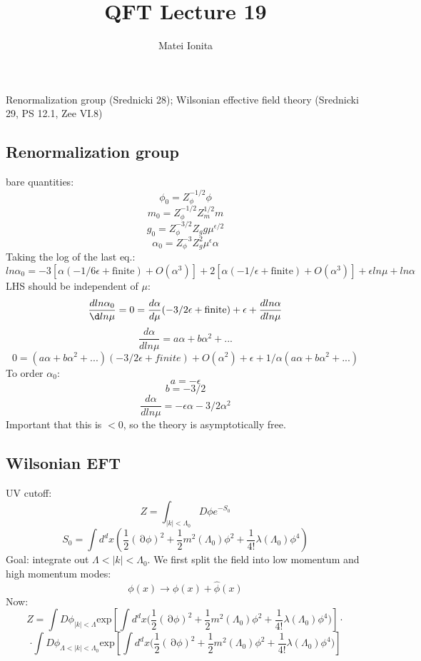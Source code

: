 \documentclass[12 pt]{article}
\title{QFT Lecture 19}
\author{Matei Ionita}
\DeclareMathOperator {\p} {\partial}
\begin{document}
  \maketitle

Renormalization group (Srednicki 28); Wilsonian effective field theory (Srednicki 29, PS 12.1, Zee VI.8)

\subsection*{Renormalization group}

bare quantities:
\[    \phi_0  = Z_{\phi}^{-1/2} \phi    \]
\[    m_0 = Z_{\phi}^{-1/2} Z_m^{1/2} m  \]
\[    g_0 = Z_{\phi}^{-3/2} Z_g g \mu^{\epsilon/2}  \]
\[    \alpha_0 = Z_{\phi}^{-3} Z_g^2 \mu^{\epsilon} \alpha        \]
Taking the log of the last eq.:
\[      ln \alpha_0 = -3 [ \alpha(-1/6\epsilon + \text{finite} ) + O(\alpha^3) ] + 2[\alpha(-1/\epsilon + \text{finite}) + O(\alpha^3)] + \epsilon ln\mu + ln\alpha  \]
LHS should be independent of $\mu$:
\[     \frac{d ln\alpha_0}{\d ln \mu} = 0 = \frac{d \alpha}{d \mu} (-3/2\epsilon + \text{finite}) + \epsilon + \frac{d ln \alpha}{d ln \mu}    \]
\[     \frac{d\alpha}{d ln \mu} =  a\alpha + b\alpha^2 + ...     \]
\[        0 = (a\alpha + b\alpha^2 + ...) (-3/2\epsilon + finite) + O(\alpha^2) + \epsilon + 1/\alpha (a\alpha + b \alpha^2 + ... )        \]
To order $\alpha_0$:
\[     a = -\epsilon    \]
\[      b = -3/2        \]
\[    \frac{d \alpha}{d ln\mu} = -\epsilon \alpha - 3/2 \alpha^2    \]
Important that this is $<0$, so the theory is asymptotically free.


\subsection*{Wilsonian EFT}
UV cutoff:
\[     Z = \int_{|k|<\Lambda_0} D\phi e^{-S_0}    \]
\[     S_0 = \int d^d x \left( \frac{1}{2} (\p \phi)^2 + \frac{1}{2}m^2( \Lambda_0) \phi^2+ \frac{1}{4!} \lambda(\Lambda_0) \phi^4  \right)     \]
Goal: integrate out $\Lambda<|k|<\Lambda_0$. We first split the field into low momentum and high momentum modes:
\[    \phi(x) \to \phi(x) + \hat \phi(x)       \]
Now:
\[       Z = \int D\phi_{|k|<\Lambda}\text{exp}\left[\int d^d x \big( \frac{1}{2} (\p \phi)^2 + \frac{1}{2}m^2( \Lambda_0) \phi^2+ \frac{1}{4!} \lambda(\Lambda_0) \phi^4  \big)\right]   \cdot   \]
\[      \cdot     \int D\phi_{\Lambda<|k|<\Lambda_0}\text{exp}\left[\int d^d x \big( \frac{1}{2} (\p \phi)^2 + \frac{1}{2}m^2( \Lambda_0) \phi^2+ \frac{1}{4!} \lambda(\Lambda_0) \phi^4  \big)\right]    \]
\end{document}
